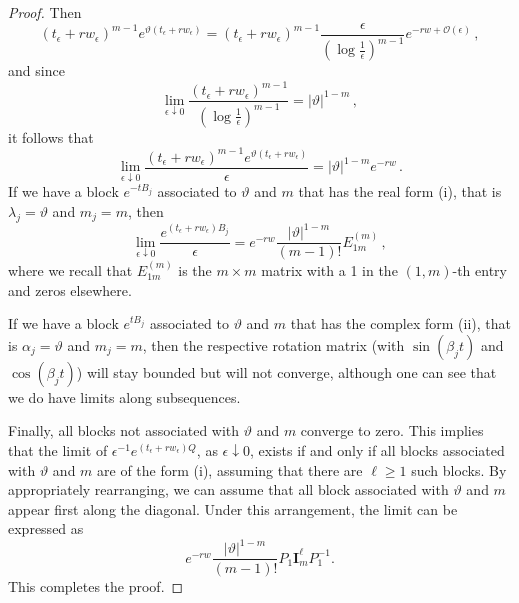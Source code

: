 \documentclass[12pt,thmsa]{article}
\begin{document}
\begin{proof}
	Then 
	$$\left(t_\epsilon + r w_\epsilon\right)^{m-1} e^{\vartheta(t_\epsilon + r w_\epsilon)}=\left(t_\epsilon + r w_\epsilon\right)^{m-1}\frac{\epsilon}{\left(\log\frac{1}{\epsilon}\right)^{m-1}}e^{-rw+\mathcal{O}(\epsilon)}\,,$$
	and since 
	$$\lim_{\epsilon\downarrow 0} \frac{\left(t_\epsilon + r w_\epsilon\right)^{m-1}}{\left(\log\frac{1}{\epsilon}\right)^{m-1}}=|\vartheta|^{1-m}\,,$$
	it follows that 
	$$\lim_{\epsilon\downarrow 0}\frac{\left(t_\epsilon + r w_\epsilon\right)^{m-1} e^{ \vartheta(t_\epsilon + r w_\epsilon)}}{\epsilon} =|\vartheta|^{1-m}e^{-rw}\,.$$
	If we have a block $e^{-tB_j}$ associated to $\vartheta$ and $m$ that has the real form (i), that is $\lambda_j=\vartheta$ and $m_j=m$, then
	$$\lim_{\epsilon\downarrow 0}\frac{ e^{ (t_\epsilon+rw_\epsilon) B_j}}{\epsilon}= e^{-rw}\frac{|\vartheta|^{1-m}}{(m-1)!} E^{(m)}_{1m}\,,$$
	where we recall that $E^{(m)}_{1m}$ is the $m\times m$ matrix with a 1 in the $(1,m)$-th entry and zeros elsewhere.
	
	If we have a block $e^{tB_j}$ associated to $\vartheta$ and $m$ that has the complex form (ii), that is $\alpha_j=\vartheta$ and $m_j=m$, then the respective rotation matrix (with $\sin\left(\beta_jt\right)$ and $\cos\left(\beta_j t\right)$) will stay bounded but will not converge, although one can see that we do have limits along subsequences. 
	
	Finally, all  blocks not associated with $\vartheta$ and $m$  converge to zero. This implies  that  the limit of $\epsilon^{-1}e^{ \left(t_\epsilon + r w_\epsilon\right) Q}$, as $\epsilon\downarrow 0$, exists  if and only if all  blocks associated with $\vartheta$ and $m$ are of the form (i),  assuming that there are $\ell\ge 1$ such blocks.  By appropriately rearranging, we can assume that all block associated with $\vartheta$ and $m$ appear first along the diagonal. Under this arrangement, the limit can be expressed as
	$$e^{-rw}\frac{|\vartheta|^{1-m}}{(m-1)!} P_1\mathbf{I}^{\ell}_mP_1^{-1}.$$   
	This completes the proof. \end{proof}
\end{document}
